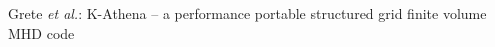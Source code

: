 \documentclass[10pt,journal,compsoc]{IEEEtran}
\begin{document}
% 
%


{Grete \MakeLowercase{\textit{et al.}}: K-Athena
-- a performance portable structured grid finite volume MHD code}
% 



\end{document}
